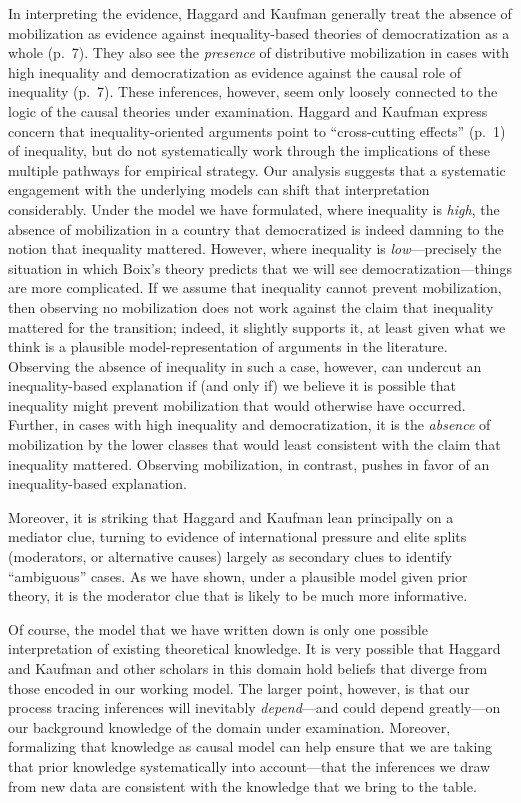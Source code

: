 \documentclass[12pt,]{book}
\begin{document}
In interpreting the evidence, Haggard and Kaufman generally treat the absence of mobilization as evidence against inequality-based theories of democratization as a whole (p.~7). They also see the \emph{presence} of distributive mobilization in cases with high inequality and democratization as evidence against the causal role of inequality (p.~7). These inferences, however, seem only loosely connected to the logic of the causal theories under examination. Haggard and Kaufman express concern that inequality-oriented arguments point to ``cross-cutting effects'' (p.~1) of inequality, but do not systematically work through the implications of these multiple pathways for empirical strategy. Our analysis suggests that a systematic engagement with the underlying models can shift that interpretation considerably. Under the model we have formulated, where inequality is \emph{high}, the absence of mobilization in a country that democratized is indeed damning to the notion that inequality mattered. However, where inequality is \emph{low}---precisely the situation in which Boix's theory predicts that we will see democratization---things are more complicated. If we assume that inequality cannot prevent mobilization, then observing no mobilization does not work against the claim that inequality mattered for the transition; indeed, it slightly supports it, at least given what we think is a plausible model-representation of arguments in the literature. Observing the absence of inequality in such a case, however, can undercut an inequality-based explanation if (and only if) we believe it is possible that inequality might prevent mobilization that would otherwise have occurred. Further, in cases with high inequality and democratization, it is the \emph{absence} of mobilization by the lower classes that would least consistent with the claim that inequality mattered. Observing mobilization, in contrast, pushes in favor of an inequality-based explanation.

Moreover, it is striking that Haggard and Kaufman lean principally on a mediator clue, turning to evidence of international pressure and elite splits (moderators, or alternative causes) largely as secondary clues to identify ``ambiguous'' cases. As we have shown, under a plausible model given prior theory, it is the moderator clue that is likely to be much more informative.

Of course, the model that we have written down is only one possible interpretation of existing theoretical knowledge. It is very possible that Haggard and Kaufman and other scholars in this domain hold beliefs that diverge from those encoded in our working model. The larger point, however, is that our process tracing inferences will inevitably \emph{depend}---and could depend greatly---on our background knowledge of the domain under examination. Moreover, formalizing that knowledge as causal model can help ensure that we are taking that prior knowledge systematically into account---that the inferences we draw from new data are consistent with the knowledge that we bring to the table.
\end{document}
